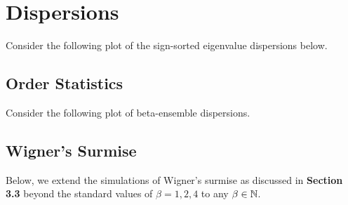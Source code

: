 \newpage
\section{Dispersions}

Consider the following plot of the sign-sorted eigenvalue dispersions below.

\subsection{Order Statistics}

Consider the following plot of beta-ensemble dispersions.


\newpage
\subsection{Wigner's Surmise}


Below, we extend the simulations of Wigner's surmise as discussed in \textbf{Section 3.3} beyond the standard values of $\beta = 1,2,4$ to any $\beta \in \mathbb{N}$.



